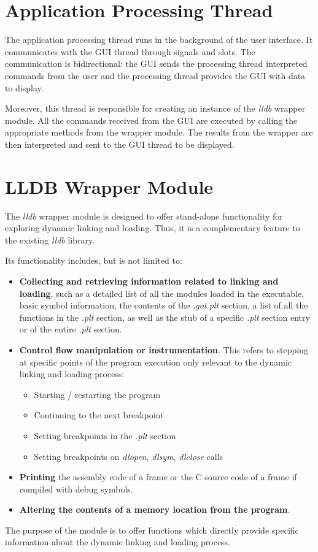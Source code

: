 \section{Application Processing Thread}
\label{sec:app-thread-arch}

The application processing thread runs in the background of the user interface. It communicates with the GUI thread through signals and slots. The communication is bidirectional: the GUI sends the processing thread interpreted commands from the user and the processing thread provides the GUI with data to display.

Moreover, this thread is responsible for creating an instance of the \textit{lldb} wrapper module. All the commands received from the GUI are executed by calling the appropriate methods from the wrapper module. The results from the wrapper are then interpreted and sent to the GUI thread to be displayed.

\section{LLDB Wrapper Module}
\label{sec:lldb-module-arch}

The \textit{lldb} wrapper module is designed to offer stand-alone functionality for exploring dynamic linking and loading. Thus, it is a complementary feature to the existing \textit{lldb} library.

Its functionality includes, but is not limited to:
\begin{itemize}
\item \textbf{Collecting and retrieving information related to linking and loading}, such as a detailed list of all the modules loaded in the executable, basic symbol information, the contents of the \textit{.got.plt} section, a list of all the functions in the \textit{.plt} section, as well as the stub of a specific \textit{.plt} section entry or of the entire \textit{.plt} section.
\item \textbf{Control flow manipulation or instrumentation}. This refers to stepping at specific points of the program execution only relevant to the dynamic linking and loading process:
\begin{itemize}
\item Starting / restarting the program
\item Continuing to the next breakpoint
\item Setting breakpoints in the \textit{.plt} section
\item Setting breakpoints on \textit{dlopen}, \textit{dlsym}, \textit{dlclose} calls
\end{itemize}
\item \textbf{Printing} the assembly code of a frame or the C source code of a frame if compiled with debug symbols.
\item \textbf{Altering the contents of a memory location from the program}.
\end{itemize}

The purpose of the module is to offer functions which directly provide specific information about the dynamic linking and loading process.